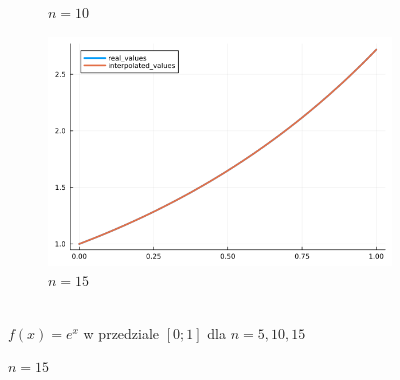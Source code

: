 \documentclass{article}
\def\v{0.47}
\begin{document}
\begin{figure}[H]
\begin{subfigure}[b]{\v\linewidth}
			\caption{$n = 10$}
		\end{subfigure}
		\begin{subfigure}[b]{\v\linewidth}
			\includegraphics[width=\linewidth]{graphs/zad5.a.15.png}
			\caption{$n = 15$}
		\end{subfigure}
	\\{$f(x) = e^x$ w przedziale $[0;1]$ dla $n = 5,10,15$}
	\end{figure}
\end{document}
